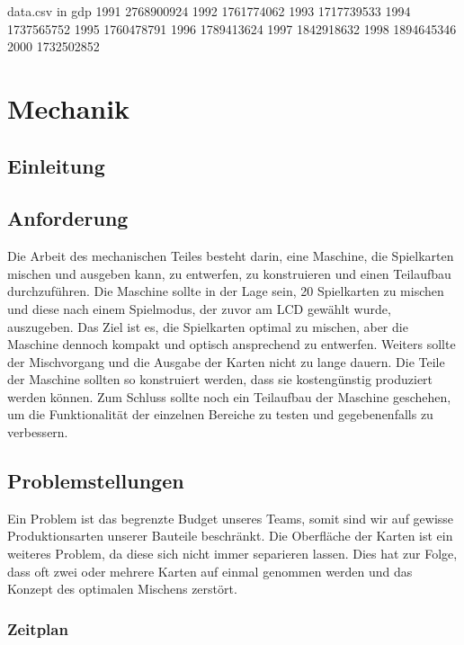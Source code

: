 \begin{filecontents*}{data.csv}
    in gdp
    1991  2768900924
    1992  1761774062
    1993  1717739533
    1994  1737565752
    1995  1760478791
    1996  1789413624
    1997  1842918632
    1998  1894645346
    2000  1732502852
\end{filecontents*}

\chapter{Mechanik}
\section{Einleitung}

\section{Anforderung}
\label{sec:Anforderung}
Die Arbeit des mechanischen Teiles besteht darin, eine Maschine,
die Spielkarten mischen und ausgeben kann, zu entwerfen, zu konstruieren
und einen Teilaufbau durchzuführen. Die Maschine sollte in der Lage
sein, 20 Spielkarten zu mischen und diese nach einem Spielmodus, der
zuvor am LCD gewählt wurde, auszugeben. Das Ziel ist es, die Spielkarten
optimal zu mischen, aber die Maschine dennoch kompakt und optisch
ansprechend zu entwerfen. Weiters sollte der Mischvorgang und die
Ausgabe der Karten nicht zu lange dauern. Die Teile der Maschine
sollten so konstruiert werden, dass sie kostengünstig produziert
werden können. Zum Schluss sollte noch ein Teilaufbau der Maschine
geschehen, um die Funktionalität der einzelnen Bereiche zu testen
und gegebenenfalls zu verbessern.

\section{Problemstellungen}
Ein Problem ist das begrenzte Budget unseres Teams, somit sind
wir auf gewisse Produktionsarten unserer Bauteile beschränkt.
Die Oberfläche der Karten ist ein
weiteres Problem, da diese sich nicht immer separieren lassen. Dies
hat zur Folge, dass oft zwei oder mehrere Karten auf einmal genommen
werden und das Konzept des optimalen Mischens zerstört.

\newpage
\subsection{Zeitplan}

